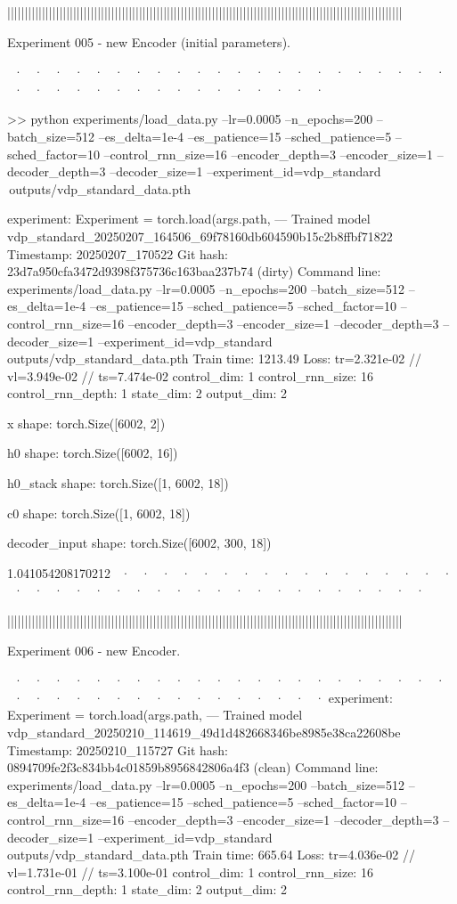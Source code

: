 ||||||||||||||||||||||||||||||||||||||||||||||||||||||||||||||||||||||||||||||||||||||||||||||||||||||||||||||||||


Experiment 005 - new Encoder (initial parameters).  

 

~· ~· ~· ~· ~· ~· ~· ~· ~· ~· ~· ~· ~· ~· ~· ~· ~· ~· ~· ~· ~· ~· ~· ~· ~· ~· ~· ~· ~· ~· ~· ~· ~· ~· ~· ~· ~· ~·  

>> python experiments/load_data.py  --lr=0.0005 --n_epochs=200 --batch_size=512 --es_delta=1e-4 --es_patience=15 --sched_patience=5 --sched_factor=10 --control_rnn_size=16 --encoder_depth=3 --encoder_size=1 --decoder_depth=3 --decoder_size=1 --experiment_id=vdp_standard  outputs/vdp_standard_data.pth  

experiment: Experiment = torch.load(args.path,
--- Trained model   vdp_standard_20250207_164506_69f78160db604590b15c2b8ffbf71822
Timestamp:      20250207_170522
Git hash:       23d7a950cfa3472d9398f375736c163baa237b74 (dirty)
Command line:   experiments/load_data.py --lr=0.0005 --n_epochs=200 --batch_size=512 --es_delta=1e-4 --es_patience=15 --sched_patience=5 --sched_factor=10 --control_rnn_size=16 --encoder_depth=3 --encoder_size=1 --decoder_depth=3 --decoder_size=1 --experiment_id=vdp_standard outputs/vdp_standard_data.pth
Train time:     1213.49
Loss:           tr=2.321e-02 // vl=3.949e-02 // ts=7.474e-02
control_dim: 1
control_rnn_size: 16
control_rnn_depth: 1
state_dim: 2
output_dim: 2



x shape: torch.Size([6002, 2])

h0 shape: torch.Size([6002, 16])

h0_stack shape: torch.Size([1, 6002, 18])

c0 shape: torch.Size([1, 6002, 18])

decoder_input shape: torch.Size([6002, 300, 18])



1.041054208170212
~· ~· ~· ~· ~· ~· ~· ~· ~· ~· ~· ~· ~· ~· ~· ~· ~· ~· ~· ~· ~· ~· ~· ~· ~· ~· ~· ~· ~· ~· ~· ~· ~· ~· ~· ~· ~· ~· 



||||||||||||||||||||||||||||||||||||||||||||||||||||||||||||||||||||||||||||||||||||||||||||||||||||||||||||||||||


Experiment 006 - new Encoder.

 		  
~· ~· ~· ~· ~· ~· ~· ~· ~· ~· ~· ~· ~· ~· ~· ~· ~· ~· ~· ~· ~· ~· ~· ~· ~· ~· ~· ~· ~· ~· ~· ~· ~· ~· ~· ~· ~· ~· 
  experiment: Experiment = torch.load(args.path,
--- Trained model   vdp_standard_20250210_114619_49d1d482668346be8985e38ca22608be
Timestamp:      20250210_115727
Git hash:       0894709fe2f3c834bb4c01859b8956842806a4f3 (clean)
Command line:   experiments/load_data.py --lr=0.0005 --n_epochs=200 --batch_size=512 --es_delta=1e-4 --es_patience=15 --sched_patience=5 --sched_factor=10 --control_rnn_size=16 --encoder_depth=3 --encoder_size=1 --decoder_depth=3 --decoder_size=1 --experiment_id=vdp_standard outputs/vdp_standard_data.pth
Train time:     665.64
Loss:           tr=4.036e-02 // vl=1.731e-01 // ts=3.100e-01
control_dim: 1
control_rnn_size: 16
control_rnn_depth: 1
state_dim: 2
output_dim: 2



